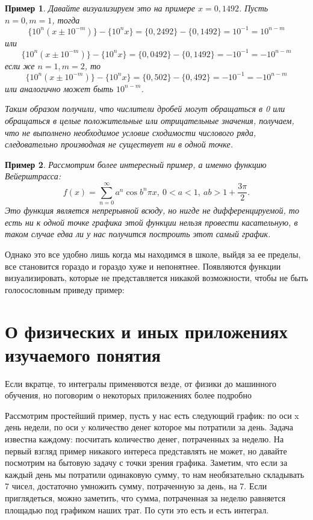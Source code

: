 \documentclass{book} %
\newtheorem{example}{Пример}[chapter] %
\theoremstyle{definition}
\theoremstyle{remark}
\begin{document}
\begin{example}
			Давайте визуализируем это на примере $x = 0,1492$. Пусть $n=0, m=1$, тогда
			\begin{equation*}
				\{10^n(x \pm 10^{-m})\} - \{10^nx\} = \{0,2492\} - \{0,1492\} = 10^{-1} = 10^{n-m}
			\end{equation*}
			или 
			\begin{equation*}
				\{10^n(x \pm 10^{-m})\} - \{10^nx\} = \{0,0492\} - \{0,1492\} = -10^{-1} = -10^{n-m}
			\end{equation*}
			если же $n = 1, m = 2$, то
			\begin{equation*}
				\{10^n(x \pm  10^{-m})\} - \{10^nx\} = \{0,502\} - \{0,492\} = -10^{-1} = -10^{n-m}
			\end{equation*}
			или аналогично может быть $10^{n-m}$.
			
			Таким образом получили, что числители дробей могут обращаться в 0 или обращаться в целые положительные или отрицательные значения, получаем, что не выполнено необходимое условие сходимости числового ряда, следовательно производная не существует ни в одной точке.
		\end{example}
		\begin{example}
		Рассмотрим более интересный пример, а именно функцию Вейерштрасса:
		\begin{equation*}
			f(x) = \sum\limits_{n=0}^{\infty} a^n \cos{b^n \pi x}, \ 0 < a < 1, \ ab > 1 + \dfrac{3\pi}2.
		\end{equation*}
		Это функция является непрерывной всюду, но нигде не дифференцируемой, то есть ни к одной точке графика этой функции нельзя провести касательную, в таком случае едва ли у нас получится построить этот самый график.
		\end{example}
		
		
		Однако это все удобно лишь когда мы находимся в школе, выйдя за ее пределы, все становится гораздо и гораздо хуже и непонятнее. Появляются функции визуализировать, которые не представляется никакой возможности, чтобы не быть голосословным приведу пример:
	\section{О физических и иных приложениях изучаемого понятия}
		Если вкратце, то интегралы применяются везде, от физики до машинного обучения, но поговорим о некоторых приложениях более подробно
		
		Рассмотрим простейший пример, пусть у нас есть следующий график: по оси x день недели, по оси y количество денег которое мы потратили за день. Задача известна каждому: посчитать количество денег, потраченных за неделю. На первый взгляд пример никакого интереса представлять не может, но давайте посмотрим на бытовую задачу с точки зрения графика. Заметим, что если за каждый день мы потратили одинаковую сумму, то нам необязательно складывать 7 чисел, достаточно умножить сумму, потраченную за день, на 7. Если приглядеться, можно заметить, что сумма, потраченная за неделю равняется площадью под графиком наших трат. По сути это есть и есть интеграл. 
		
\end{document}
